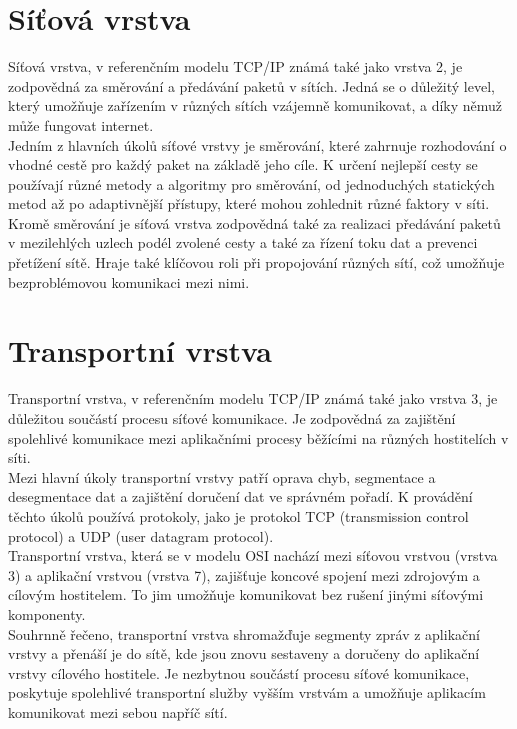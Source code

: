 \documentclass[12pt]{report}			%
\begin{document}
			\section{Síťová vrstva}
Síťová vrstva, v referenčním modelu TCP/IP známá také jako vrstva 2, je zodpovědná za směrování a předávání paketů v sítích. Jedná se o důležitý level, který umožňuje zařízením v různých sítích vzájemně komunikovat, a díky němuž může fungovat internet.
\\
Jedním z hlavních úkolů síťové vrstvy je směrování, které zahrnuje rozhodování o vhodné cestě pro každý paket na základě jeho cíle. K určení nejlepší cesty se používají různé metody a algoritmy pro směrování, od jednoduchých statických metod až po adaptivnější přístupy, které mohou zohlednit různé faktory v síti.
\\
Kromě směrování je síťová vrstva zodpovědná také za realizaci předávání paketů v mezilehlých uzlech podél zvolené cesty a také za řízení toku dat a prevenci přetížení sítě. Hraje také klíčovou roli při propojování různých sítí, což umožňuje bezproblémovou komunikaci mezi nimi.\cite{sit1} \cite{sit2}

			\section{Transportní vrstva}
Transportní vrstva, v referenčním modelu TCP/IP známá také jako vrstva 3, je důležitou součástí procesu síťové komunikace. Je zodpovědná za zajištění spolehlivé komunikace mezi aplikačními procesy běžícími na různých hostitelích v síti.
\\
Mezi hlavní úkoly transportní vrstvy patří oprava chyb, segmentace a desegmentace dat a zajištění doručení dat ve správném pořadí. K provádění těchto úkolů používá protokoly, jako je protokol TCP (transmission control protocol) a UDP (user datagram protocol).
\\
Transportní vrstva, která se v modelu OSI nachází mezi síťovou vrstvou (vrstva 3) a aplikační vrstvou (vrstva 7), zajišťuje koncové spojení mezi zdrojovým a cílovým hostitelem. To jim umožňuje komunikovat bez rušení jinými síťovými komponenty.
\\
Souhrnně řečeno, transportní vrstva shromažďuje segmenty zpráv z aplikační vrstvy a přenáší je do sítě, kde jsou znovu sestaveny a doručeny do aplikační vrstvy cílového hostitele. Je nezbytnou součástí procesu síťové komunikace, poskytuje spolehlivé transportní služby vyšším vrstvám a umožňuje aplikacím komunikovat mezi sebou napříč sítí.\cite{tran1}\cite{tran2}\cite{tran3}
\end{document}
